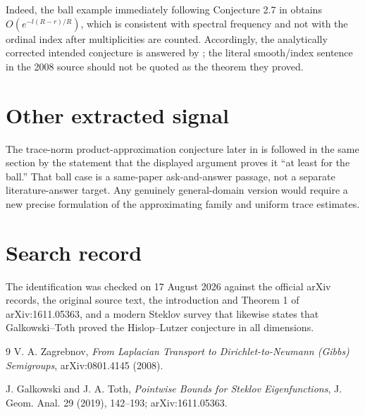 \documentclass[11pt]{article}
\begin{document}
Indeed, the ball example immediately following Conjecture 2.7 in
\cite{Zagrebnov} obtains $O(e^{-l(R-r)/R})$, which is consistent with spectral
frequency and not with the ordinal index after multiplicities are counted.
Accordingly, the analytically corrected intended conjecture is answered by
\cite{GT}; the literal smooth/index sentence in the 2008 source should not be
quoted as the theorem they proved.

\section*{Other extracted signal}

The trace-norm product-approximation conjecture later in \cite{Zagrebnov} is
followed in the same section by the statement that the displayed argument
proves it ``at least for the ball.''  That ball case is a same-paper
ask-and-answer passage, not a separate literature-answer target.  Any genuinely
general-domain version would require a new precise formulation of the
approximating family and uniform trace estimates.

\section*{Search record}

The identification was checked on 17 August 2026 against the official arXiv
records, the original source text, the introduction and Theorem 1 of
arXiv:1611.05363, and a modern Steklov survey that likewise states that
Galkowski--Toth proved the Hislop--Lutzer conjecture in all dimensions.

\begin{thebibliography}{9}
V. A. Zagrebnov,
\emph{From Laplacian Transport to Dirichlet-to-Neumann (Gibbs) Semigroups},
arXiv:0801.4145 (2008).

J. Galkowski and J. A. Toth,
\emph{Pointwise Bounds for Steklov Eigenfunctions},
J. Geom. Anal. 29 (2019), 142--193; arXiv:1611.05363.
\end{thebibliography}
\end{document}
